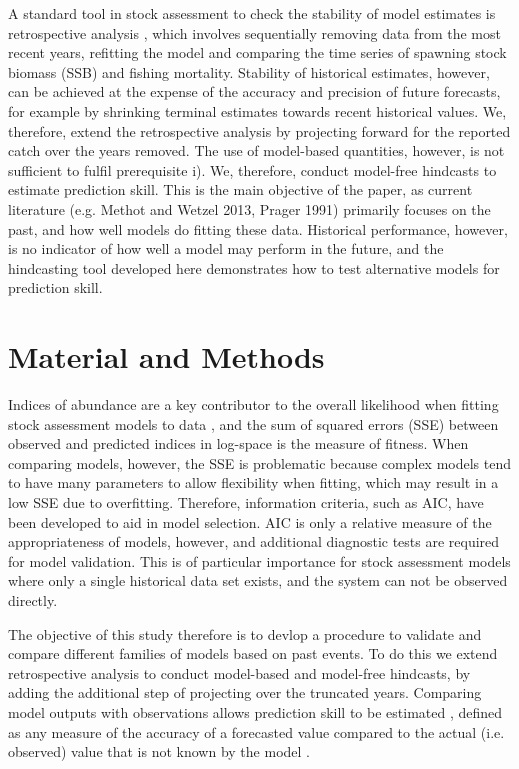\documentclass[12pt,halfline,a4paper,nonumbib]{ouparticle}
\begin{document}
A standard tool in stock assessment to check the stability of model estimates is retrospective analysis \parencite{hurtado2014looking}, which involves sequentially removing data from the most recent years, refitting the model and comparing the time series of spawning stock biomass (SSB) and fishing mortality. Stability of historical estimates, however, can be achieved at the expense of the accuracy and precision of future forecasts, for example by shrinking terminal estimates towards recent historical values. We, therefore, extend the retrospective analysis by projecting forward for the reported catch over the years removed. The use of model-based quantities, however, is not sufficient to fulfil prerequisite i). We, therefore, conduct model-free hindcasts to estimate prediction skill. This is the main objective of the paper, as current literature (e.g. Methot and Wetzel 2013, Prager 1991) primarily focuses on the past, and how well models do fitting these data. Historical performance, however, is no indicator of how well a model may perform in the future, and the hindcasting tool developed here demonstrates how to test alternative models for prediction skill.  


\section{Material and Methods}
Indices of abundance are a key contributor to the overall likelihood when fitting stock assessment models to data \parencite{whitten2013accounting}, and the sum of squared errors (SSE) between observed and predicted indices in log-space is the measure of fitness. When comparing models, however, the SSE is problematic because complex models tend to have many parameters to allow flexibility when fitting, which may result in a low SSE due to overfitting. Therefore, information criteria, such as AIC, have been developed to aid in model selection. AIC is only a relative measure of the appropriateness of models, however, and additional diagnostic tests are required for model validation. This is of particular importance for stock assessment models where only a single historical data set   exists, and the system can not be observed directly. 

The objective of this study therefore is to devlop a procedure to validate and compare different families of models based on past events. To do this we extend retrospective analysis to conduct model-based and model-free hindcasts, by adding the additional step of projecting over the truncated years. Comparing model outputs with observations allows prediction skill to be estimated \parencite{kell2016xval}, defined as any measure of the accuracy of a forecasted value compared to the actual (i.e. observed) value that is not known by the model \parencite{glickman2000glossary}. 
\end{document}
